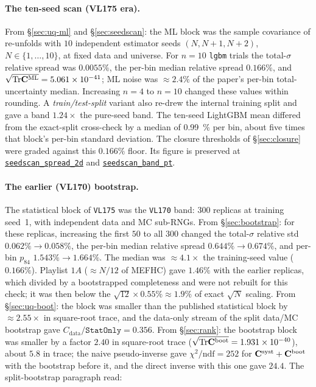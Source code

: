 \paragraph{The ten-seed scan (VL175 era).} From \S\ref{sec:uq-ml} and \S\ref{sec:seedscan}: the ML block was the sample covariance of re-unfolds with $10$ independent estimator seeds $(N,N{+}1,N{+}2)$, $N\in\{1,\dots,10\}$, at fixed data and universe. For $n=10$ \texttt{lgbm} trials the total-$\sigma$ relative spread was $0.0055\%$, the per-bin median relative spread $0.166\%$, and $\sqrt{\mathrm{Tr}\mathbf{C}^{\text{ML}}} = 5.061\times10^{-41}$; ML noise was $\approx 2.4\%$ of the paper's per-bin total-uncertainty median. Increasing $n=4$ to $n=10$ changed these values within rounding. A \emph{train/test-split} variant also re-drew the internal training split and gave a band $1.24\times$ the pure-seed band. The ten-seed LightGBM mean differed from the exact-split cross-check by a median of \SI{0.99}{\percent} per bin, about five times that block's per-bin standard deviation. The closure thresholds of \S\ref{sec:closure} were graded against this $0.166\%$ floor. Its figure is preserved at \href{https://github.com/josephbaileyy/MINERvA-OmniFold/blob/ae198cc1f0b2f5f0781bed872d605fa42faed1d3/docs/analysis-note/figures/seedscan_spread_2d.pdf}{\texttt{seedscan\_spread\_2d}} and \href{https://github.com/josephbaileyy/MINERvA-OmniFold/blob/ae198cc1f0b2f5f0781bed872d605fa42faed1d3/docs/analysis-note/figures/seedscan_band_pt.pdf}{\texttt{seedscan\_band\_pt}}.

\paragraph{The earlier (VL170) bootstrap.} The statistical block of \texttt{VL175} was the \texttt{VL170} band: $300$ replicas at training seed~1, with independent data and MC sub-RNGs. From \S\ref{sec:bootstrap}: for these replicas, increasing the first $50$ to all $300$ changed the total-$\sigma$ relative std $0.062\%\to0.058\%$, the per-bin median relative spread $0.644\%\to0.674\%$, and per-bin $p_{84}$ $1.543\%\to1.664\%$. The median was $\approx 4.1\times$ the training-seed value ($0.166\%$). Playlist $1A$ ($\approx N/12$ of MEFHC) gave $1.46\%$ with the earlier replicas, which divided by a bootstrapped completeness and were not rebuilt for this check; it was then below the $\sqrt{12}\times 0.55\% \approx 1.9\%$ of exact $\sqrt{N}$ scaling. From \S\ref{sec:uq-boot}: the block was smaller than the published statistical block by $\approx2.55\times$ in square-root trace, and the data-only stream of the split data/MC bootstrap gave $C_{\mathrm{data}}/\texttt{StatOnly}=0.356$. From \S\ref{sec:rank}: the bootstrap block was smaller by a factor $2.40$ in square-root trace ($\sqrt{\mathrm{Tr}\mathbf{C}^{\text{boot}}}=1.931\times10^{-40}$), about $5.8$ in trace; the naive pseudo-inverse gave $\chi^{2}/\mathrm{ndf}=252$ for $\mathbf{C}^{\text{syst}}+\mathbf{C}^{\text{boot}}$ with the bootstrap before it, and the direct inverse with this one gave $24.4$. The split-bootstrap paragraph read:

